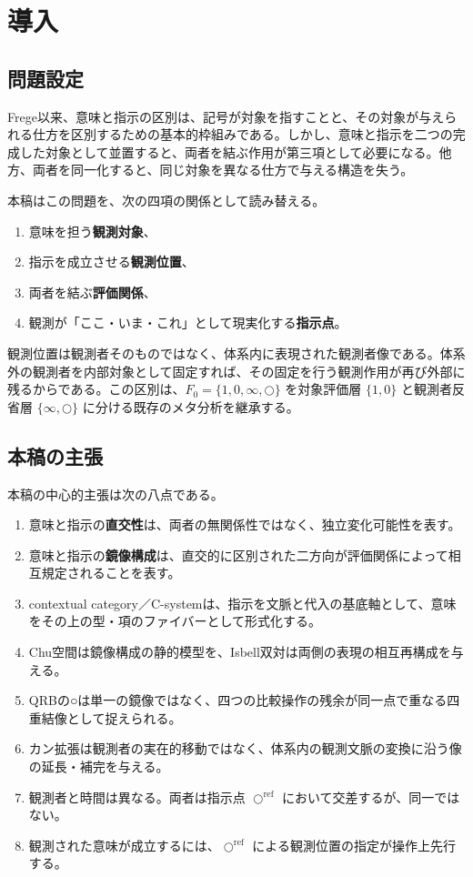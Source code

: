 \documentclass[a4paper,11pt]{ltjsarticle}
\theoremstyle{definition}
\theoremstyle{plain}
\newcommand{\CircleRef}{\bigcirc^{\mathrm{ref}}}
\begin{document}
\tableofcontents

\section{導入}

\subsection{問題設定}

Frege以来、意味と指示の区別は、記号が対象を指すことと、その対象が与えられる仕方を区別するための基本的枠組みである\cite{Frege1892Sinn}。しかし、意味と指示を二つの完成した対象として並置すると、両者を結ぶ作用が第三項として必要になる。他方、両者を同一化すると、同じ対象を異なる仕方で与える構造を失う。

本稿はこの問題を、次の四項の関係として読み替える。
\begin{enumerate}
 \item 意味を担う\textbf{観測対象}、
 \item 指示を成立させる\textbf{観測位置}、
 \item 両者を結ぶ\textbf{評価関係}、
 \item 観測が「ここ・いま・これ」として現実化する\textbf{指示点}。
\end{enumerate}
観測位置は観測者そのものではなく、体系内に表現された観測者像である。体系外の観測者を内部対象として固定すれば、その固定を行う観測作用が再び外部に残るからである。この区別は、$F_0=\{1,0,\infty,\bigcirc\}$ を対象評価層 $\{1,0\}$ と観測者反省層 $\{\infty,\bigcirc\}$ に分ける既存のメタ分析を継承する\cite{ChibaF02026}。

\subsection{本稿の主張}

本稿の中心的主張は次の八点である。
\begin{enumerate}
 \item 意味と指示の\textbf{直交性}は、両者の無関係性ではなく、独立変化可能性を表す。
 \item 意味と指示の\textbf{鏡像構成}は、直交的に区別された二方向が評価関係によって相互規定されることを表す。
 \item contextual category／C-systemは、指示を文脈と代入の基底軸として、意味をその上の型・項のファイバーとして形式化する。
 \item Chu空間は鏡像構成の静的模型を、Isbell双対は両側の表現の相互再構成を与える。
 \item QRBの○は単一の鏡像ではなく、四つの比較操作の残余が同一点で重なる四重結像として捉えられる。
 \item カン拡張は観測者の実在的移動ではなく、体系内の観測文脈の変換に沿う像の延長・補完を与える。
 \item 観測者と時間は異なる。両者は指示点 $\CircleRef$ において交差するが、同一ではない。
 \item 観測された意味が成立するには、$\CircleRef$ による観測位置の指定が操作上先行する。
\end{enumerate}
\end{document}
